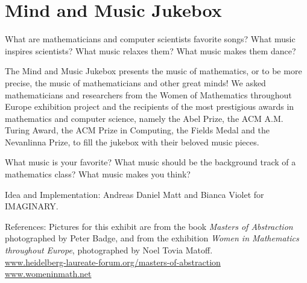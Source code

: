 \section{Mind and Music Jukebox}
What are mathematicians and computer scientists favorite songs? What music inspires scientists? What music relaxes them? What music makes them dance?

The Mind and Music Jukebox presents the music of mathematics, or to be more precise, the music of mathematicians and other great minds! We asked mathematicians and researchers from the Women of Mathematics throughout Europe exhibition project and the recipients of the most prestigious awards in mathematics and computer science, namely the Abel Prize, the ACM A.M. Turing Award, the ACM Prize in Computing, the Fields Medal and the Nevanlinna Prize, to fill the jukebox with their beloved music pieces.

What music is your favorite? What music should be the background track of a mathematics class? What music makes you think?

\begin{sectcredits}
\item[Idea and Implementation:] Andreas Daniel Matt and Bianca Violet for IMAGINARY.

\item[References:]
Pictures for this exhibit are from the book \emph{Masters of Abstraction} photographed by Peter Badge, and from the exhibition \emph{Women in Mathematics throughout Europe}, photographed by Noel Tovia Matoff.
\\ \url{www.heidelberg-laureate-forum.org/masters-of-abstraction}
\\ \url{www.womeninmath.net}

\end{sectcredits}
